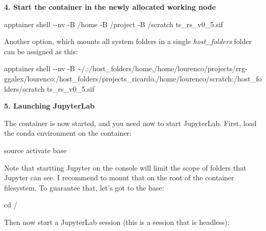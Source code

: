 \documentclass[
]{book}
\newenvironment{Shaded}{\begin{snugshade}}{\end{snugshade}}
\newcommand{\AttributeTok}[1]{\textcolor[rgb]{0.77,0.63,0.00}{#1}}
\newcommand{\BuiltInTok}[1]{#1}
\newcommand{\ExtensionTok}[1]{#1}
\newcommand{\FunctionTok}[1]{\textcolor[rgb]{0.00,0.00,0.00}{#1}}
\newcommand{\NormalTok}[1]{#1}
\newcommand{\VariableTok}[1]{\textcolor[rgb]{0.00,0.00,0.00}{#1}}
\begin{document}
\textbf{4. Start the container in the newly allocated working node}

\begin{Shaded}
\begin{Highlighting}[]
\ExtensionTok{apptainer}\NormalTok{ shell }\AttributeTok{{-}{-}nv} \AttributeTok{{-}B}\NormalTok{ /home }\AttributeTok{{-}B}\NormalTok{ /project }\AttributeTok{{-}B}\NormalTok{ /scratch ts\_rs\_v0\_5.sif}
\end{Highlighting}
\end{Shaded}

Another option, which mounts all system folders in a single \emph{host\_folders} folder can be assigned as this:

\begin{Shaded}
\begin{Highlighting}[]
\ExtensionTok{apptainer}\NormalTok{ shell }\AttributeTok{{-}{-}nv} \AttributeTok{{-}B}\NormalTok{ \textasciitilde{}/.:/host\_folders/home,/home/lourenco/projects/rrg{-}ggalex/lourenco:/host\_folders/projects\_ricardo,/home/lourenco/scratch:/host\_folders/scratch ts\_rs\_v0\_5.sif}
\end{Highlighting}
\end{Shaded}

\textbf{5. Launching JupyterLab}

The container is now started, and you need now to start JupyterLab. First, load the conda environment on the container:

\begin{Shaded}
\begin{Highlighting}[]
\BuiltInTok{source}\NormalTok{ activate base}
\end{Highlighting}
\end{Shaded}

Note that startting Jupyter on the console will limit the scope of folders that Jupyter can see. I recommend to mount that on the root of the container filesystem. To guarantee that, let's got to the base:

\begin{Shaded}
\begin{Highlighting}[]
\BuiltInTok{cd}\NormalTok{ /}
\end{Highlighting}
\end{Shaded}

Then now start a JupyterLab session (this is a session that is headless):

\begin{Shaded}
\end{Shaded}
\end{document}

